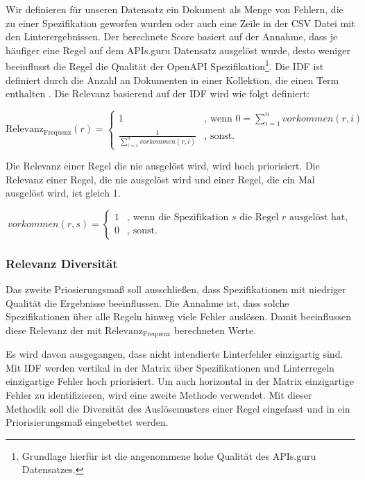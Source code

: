 Wir definieren für unseren Datensatz ein Dokument als Menge von Fehlern, die zu einer Spezifikation geworfen wurden oder auch eine Zeile in der \acs{CSV} Datei mit den Linterergebnissen. Der berechnete Score basiert auf der Annahme, dass je häufiger eine Regel auf dem APIs.guru Datensatz ausgelöst wurde, desto weniger beeinflusst die Regel die Qualität der OpenAPI Spezifikation\footnote{Grundlage hierfür ist die angenommene hohe Qualität des APIs.guru Datensatzes.}. Die \acl{IDF} ist definiert durch die Anzahl an Dokumenten in einer Kollektion, die einen Term enthalten \parencite{manning_introduction_2008}. Die  Relevanz basierend auf der \acl{IDF} wird wie folgt definiert:

\[
\text{Relevanz}_\text{Frequenz}(r) = 
\begin{cases}
1&\text{, wenn } 0 = \sum_{i=1}^{n}vorkommen(r, i) \\
\frac{1}{\sum_{i=1}^{n}vorkommen(r, i)}&\text{, sonst}.
\end{cases}
\]

Die Relevanz einer Regel die nie ausgelöst wird, wird hoch priorisiert. Die Relevanz einer Regel, die nie ausgelöst wird und einer Regel, die ein Mal ausgelöst wird, ist gleich 1.

\[
vorkommen(r, s) = 
\begin{cases} 
1&\text{, wenn die Spezifikation } s \text{ die Regel } r \text{ ausgelöst hat}, \\
0&\text{, sonst}.
\end{cases}
\]


\subsubsection{Relevanz Diversität} \label{sec:diveritätsscoring}
Das zweite Priosierungsmaß soll ausschließen, dass Spezifikationen mit niedriger Qualität die Ergebnisse beeinflussen. Die Annahme ist, dass solche Spezifikationen über alle Regeln hinweg viele Fehler auslösen. Damit beeinflussen diese Relevanz der mit $\text{Relevanz}_\text{Frequenz}$ berechneten Werte.

Es wird davon ausgegangen, dass nicht intendierte Linterfehler einzigartig sind. Mit \acs{IDF} werden vertikal in der Matrix über Spezifikationen und Linterregeln einzigartige Fehler hoch priorisiert. Um auch horizontal in der Matrix einzigartige Fehler zu identifizieren, wird eine zweite Methode verwendet. Mit dieser Methodik soll die Diversität des Auslösemusters einer Regel eingefasst und in ein Priorisierungsmaß eingebettet werden.

